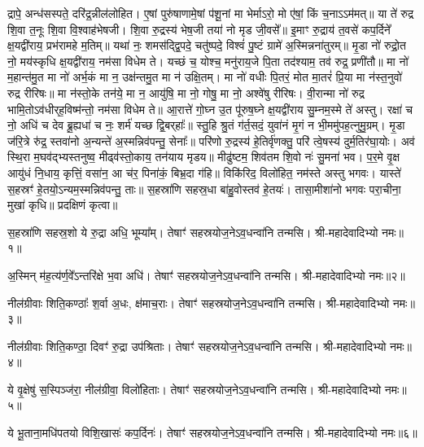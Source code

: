 
द्रापे॒ अन्ध॑सस्पते॒ दरि॑द्र॒न्नील॑लोहित। ए॒षां पुरु॑षाणामे॒षां प॑शू॒नां मा भेर्माऽरो॒ मो ए॑षां॒ किं च॒नाऽऽम॑मत्॥ या ते॑ रुद्र शि॒वा त॒नूः शि॒वा वि॒श्वाह॑भेषजी। शि॒वा रु॒द्रस्य॑ भेष॒जी तया॑ नो मृड जी॒वसे᳚॥ इ॒माꣳ रु॒द्राय॑ त॒वसे॑ कप॒र्दिने᳚ क्ष॒यद्वी॑राय॒ प्रभ॑रामहे म॒तिम्॥ यथा॑ नः॒ शमस॑द्द्वि॒पदे॒ चतु॑ष्पदे॒ विश्वं॑ पु॒ष्टं ग्रामे॑ अ॒स्मिन्नना॑तुरम्॥ मृ॒डा नो॑ रुद्रो॒त नो॒ मय॑स्कृधि क्ष॒यद्वी॑राय॒ नम॑सा विधेम ते। यच्छं च॒ योश्च॒ मनु॑राय॒जे पि॒ता तद॑श्याम॒ तव॑ रुद्र॒ प्रणी॑तौ॥ मा नो॑ म॒हान्त॑मु॒त मा नो॑ अर्भ॒कं मा न॒ उक्ष॑न्तमु॒त मा न॑ उक्षि॒तम्। मा नो॑ वधीः पि॒तरं॒ मोत मा॒तरं॑ प्रि॒या मा न॑स्त॒नुवो॑ रुद्र रीरिषः॥ मा न॑स्तो॒के तन॑ये॒ मा न॒ आयु॑षि॒ मा नो॒ गोषु॒ मा नो॒ अश्वे॑षु रीरिषः। वी॒रान्मा नो॑ रुद्र भामि॒तोऽव॑धीर्‌ह॒विष्म॑न्तो॒ नम॑सा विधेम ते॥ आ॒रात्ते॑ गो॒घ्न उ॒त पू॑रुष॒घ्ने क्ष॒यद्वी॑राय सु॒म्नम॒स्मे ते॑ अस्तु। रक्षा॑ च नो॒ अधि॑ च देव ब्रू॒ह्यधा॑ च नः॒ शर्म॑ यच्छ द्वि॒बर्‌हाः᳚॥ स्तु॒हि श्रु॒तं ग॑र्त॒सदं॒ युवा॑नं मृ॒गं न भी॒ममु॑पह॒त्नुमु॒ग्रम्। मृ॒डा ज॑रि॒त्रे रु॑द्र॒ स्तवा॑नो अ॒न्यन्ते॑ अ॒स्मन्निव॑पन्तु॒ सेनाः᳚॥ परि॑णो रु॒द्रस्य॑ हे॒तिर्वृ॑णक्तु॒ परि॑ त्वे॒षस्य॑ दुर्म॒तिर॑घा॒योः। अव॑ स्थि॒रा म॒घव॑द्भ्यस्तनुष्व॒ मीढ्व॑स्तो॒काय॒ तन॑याय मृडय॥ मीढु॑ष्टम॒ शिव॑तम शि॒वो नः॑ सु॒मना॑ भव। प॒र॒मे वृ॒क्ष आयु॑धं नि॒धाय॒ कृत्तिं॒ वसा॑न॒ आ च॑र॒ पिना॑कं॒ बिभ्र॒दा ग॑हि॥ विकि॑रिद॒ विलो॑हित॒ नम॑स्ते अस्तु भगवः। यास्ते॑ स॒हस्रꣳ॑ हे॒तयो॒ऽन्यम॒स्मन्निव॑पन्तु॒ ताः॥ स॒हस्रा॑णि सहस्र॒धा बा॑हु॒वोस्तव॑ हे॒तयः॑। तासा॒मीशा॑नो भगवः परा॒चीना॒ मुखा॑ कृधि॥
प्रदक्षिणं कृत्वा॥

{\small\closesection}


स॒हस्रा॑णि सहस्र॒शो ये रु॒द्रा अधि॒ भूम्या᳚म्। तेषाꣳ॑ सहस्रयोज॒ने\-ऽव॒धन्वा॑नि तन्मसि। श्री-महादेवादिभ्यो नमः॥१॥

अ॒स्मिन् म॑ह॒त्य॑र्ण॒वे᳚ऽन्तरि॑क्षे भ॒वा अधि॑। तेषाꣳ॑ सहस्रयोज॒ने\-ऽव॒धन्वा॑नि तन्मसि। श्री-महादेवादिभ्यो नमः॥२॥

नील॑ग्रीवाः शिति॒कण्ठाः᳚ श॒र्वा अ॒धः, क्ष॑माच॒राः। तेषाꣳ॑ सहस्रयोज॒ने\-ऽव॒धन्वा॑नि तन्मसि। श्री-महादेवादिभ्यो नमः॥३॥

नील॑ग्रीवाः शिति॒कण्ठा॒ दिवꣳ॑ रु॒द्रा उप॑श्रिताः। तेषाꣳ॑ सहस्रयोज॒ने\-ऽव॒धन्वा॑नि तन्मसि। श्री-महादेवादिभ्यो नमः॥४॥

ये वृ॒क्षेषु॑ स॒स्पिञ्ज॑रा॒ नील॑ग्रीवा॒ विलो॑हिताः। तेषाꣳ॑ सहस्रयोज॒ने\-ऽव॒धन्वा॑नि तन्मसि। श्री-महादेवादिभ्यो नमः॥५॥

ये भू॒ताना॒मधि॑पतयो विशि॒खासः॑ कप॒र्दिनः॑। तेषाꣳ॑ सहस्रयोज॒ने\-ऽव॒धन्वा॑नि तन्मसि। श्री-महादेवादिभ्यो नमः॥६॥

